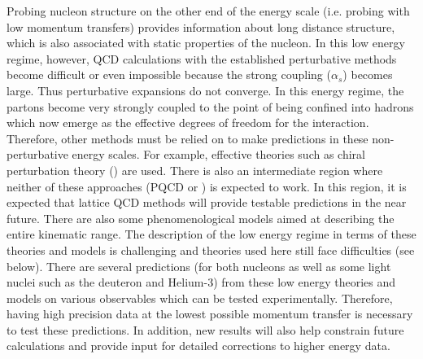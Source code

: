 Probing nucleon structure %
on the other end %
of the energy scale (i.e. probing with low momentum transfers) %
 provides information about long distance structure, %
which is also associated with static properties of the nucleon. In this low energy regime, however, QCD calculations with the established perturbative methods become difficult or even impossible because %
 the strong coupling %
($\alpha_s$)  becomes %
large.%
Thus perturbative expansions %
do not converge. %
In this energy regime, the partons become very strongly coupled to the point of being confined into hadrons which now emerge as %
the effective degrees of freedom for the interaction. Therefore, other methods must be relied on to make predictions in these non-perturbative energy scales. 
For example, %
effective theories such as chiral perturbation theory (\chipt) are used.
 There is also an %
  intermediate region where neither of these approaches (PQCD or \chipt) %
  is expected to work. In this region, it is %
  expected that lattice QCD methods will provide testable predictions in the near future. There are also some phenomenological models aimed at describing the entire kinematic range. The description of the low energy regime in terms of these theories and models is %
challenging
and theories used here %
still face difficulties (see below).%
  There are several %
  predictions (for both nucleons as well as some light nuclei %
  such as the deuteron and Helium-3) from these low energy theories and models on various   observables %
  which can be %
  tested %
  experimentally. Therefore, having high precision data at the lowest possible momentum transfer %
  is %
  necessary to test these %
  predictions. In addition, new results will also help constrain %
  future calculations and %
  provide input for detailed corrections to higher energy data.

